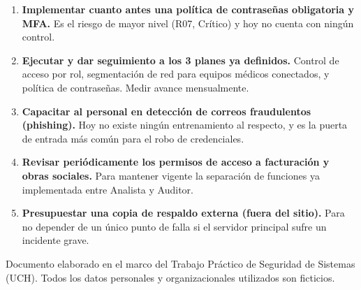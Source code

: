 \documentclass[11pt,a4paper]{article}
\begin{document}
\begin{enumerate}[leftmargin=6mm,itemsep=5pt]
  \item \textbf{Implementar cuanto antes una pol\'itica de contrase\~nas obligatoria y MFA.}
  Es el riesgo de mayor nivel (R07, Cr\'itico) y hoy no cuenta con ning\'un control.

  \item \textbf{Ejecutar y dar seguimiento a los 3 planes ya definidos.}
  Control de acceso por rol, segmentaci\'on de red para equipos m\'edicos conectados,
  y pol\'itica de contrase\~nas. Medir avance mensualmente.

  \item \textbf{Capacitar al personal en detecci\'on de correos fraudulentos (phishing).}
  Hoy no existe ning\'un entrenamiento al respecto, y es la puerta de entrada m\'as
  com\'un para el robo de credenciales.

  \item \textbf{Revisar peri\'odicamente los permisos de acceso a facturaci\'on y obras sociales.}
  Para mantener vigente la separaci\'on de funciones ya implementada entre Analista y
  Auditor.

  \item \textbf{Presupuestar una copia de respaldo externa (fuera del sitio).}
  Para no depender de un \'unico punto de falla si el servidor principal sufre un
  incidente grave.
\end{enumerate}

\vfill
\begin{center}
{\scriptsize\color{teal!70!black}
Documento elaborado en el marco del Trabajo Pr\'actico de Seguridad de Sistemas (UCH).
Todos los datos personales y organizacionales utilizados son ficticios.}
\end{center}
\end{document}
